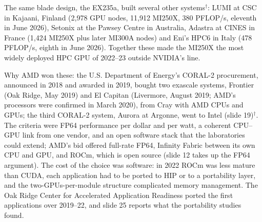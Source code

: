 \documentclass[11pt,letterpaper]{article}
\begin{document}
The same blade design, the EX235a, built several other systems$^\dagger$: LUMI at CSC in Kajaani, Finland (2{,}978 GPU nodes, 11{,}912 MI250X, 380 PFLOP/s, eleventh in June 2026), Setonix at the Pawsey Centre in Australia, Adastra at CINES in France (1{,}424 MI250X plus later MI300A nodes) and Eni's HPC6 in Italy (478 PFLOP/s, eighth in June 2026). Together these made the MI250X the most widely deployed HPC GPU of 2022--23 outside NVIDIA's line.

Why AMD won these: the U.S. Department of Energy's CORAL-2 procurement, announced in 2018 and awarded in 2019, bought two exascale systems, Frontier (Oak Ridge, May 2019) and El Capitan (Livermore, August 2019; AMD's processors were confirmed in March 2020), from Cray with AMD CPUs and GPUs; the third CORAL-2 system, Aurora at Argonne, went to Intel (slide 19)$^\dagger$. The criteria were FP64 performance per dollar and per watt, a coherent CPU--GPU link from one vendor, and an open software stack that the laboratories could extend; AMD's bid offered full-rate FP64, Infinity Fabric between its own CPU and GPU, and ROCm, which is open source (slide 12 takes up the FP64 argument). The cost of the choice was software: in 2022 ROCm was less mature than CUDA, each application had to be ported to HIP or to a portability layer, and the two-GPUs-per-module structure complicated memory management. The Oak Ridge Center for Accelerated Application Readiness ported the first applications over 2019--22, and slide 25 reports what the portability studies found.
\end{document}
